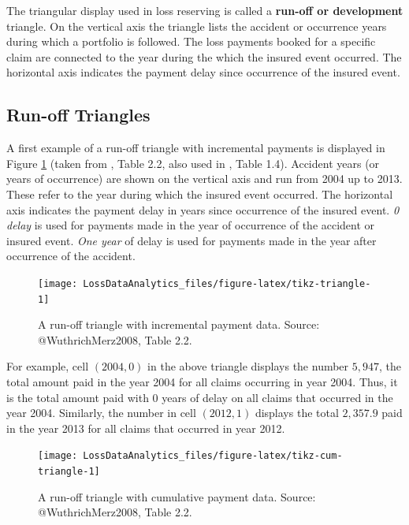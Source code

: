 \documentclass[]{book}
\begin{document}
The triangular display used in loss reserving is called a
\textbf{run-off or development} triangle. On the vertical axis the
triangle lists the accident or occurrence years during which a portfolio
is followed. The loss payments booked for a specific claim are connected
to the year during the which the insured event occurred. The horizontal
axis indicates the payment delay since occurrence of the insured event.

\subsection{Run-off Triangles}\label{run-off-triangles}

A first example of a run-off triangle with incremental payments is
displayed in Figure \ref{fig:tikz-triangle} (taken from
\citet{WuthrichMerz2008}, Table 2.2, also used in
\citet{WuthrichMerz2015}, Table 1.4). Accident years (or years of
occurrence) are shown on the vertical axis and run from 2004 up to 2013.
These refer to the year during which the insured event occurred. The
horizontal axis indicates the payment delay in years since occurrence of
the insured event. \emph{0 delay} is used for payments made in the year
of occurrence of the accident or insured event. \emph{One year} of delay
is used for payments made in the year after occurrence of the accident.

\begin{figure}

{\centering \texttt{[image: LossDataAnalytics\_files/figure-latex/tikz-triangle-1]} 

}

\caption{A run-off triangle with incremental payment data. Source: @WuthrichMerz2008, Table 2.2.}\label{fig:tikz-triangle}
\end{figure}

For example, cell \((2004, 0)\) in the above triangle displays the
number \(5,947\), the total amount paid in the year 2004 for all claims
occurring in year 2004. Thus, it is the total amount paid with 0 years
of delay on all claims that occurred in the year 2004. Similarly, the
number in cell \((2012,1)\) displays the total \(2,357.9\) paid in the
year 2013 for all claims that occurred in year 2012.

\begin{figure}

{\centering \texttt{[image: LossDataAnalytics\_files/figure-latex/tikz-cum-triangle-1]} 

}

\caption{A run-off triangle with cumulative payment data. Source: @WuthrichMerz2008, Table 2.2.}\label{fig:tikz-cum-triangle}
\end{figure}
\end{document}
